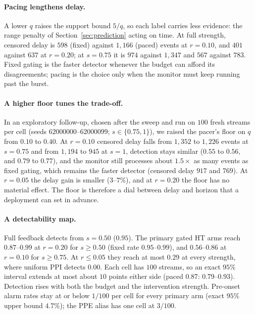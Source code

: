 \paragraph{Pacing lengthens delay.}
A lower $q$ raises the support bound $5/q$, so each label carries less evidence: the range penalty of Section~\ref{sec:prediction} acting on time.
At full strength, censored delay is $598$ (fixed) against $1{,}166$ (paced) events at $r=0.10$, and $401$ against $637$ at $r=0.20$; at $s=0.75$ it is $974$ against $1{,}347$ and $567$ against $783$.
Fixed gating is the faster detector whenever the budget can afford its disagreements; pacing is the choice only when the monitor must keep running past the burst.

\paragraph{A higher floor tunes the trade-off.}
In an exploratory follow-up, chosen after the sweep and run on $100$ fresh streams per cell (seeds $62000000$--$62000099$; $s\in\{0.75,1\}$), we raised the
pacer's floor on $q$ from $0.10$ to $0.40$. At $r=0.10$ censored delay falls from $1{,}352$ to $1{,}226$ events at $s=0.75$ and from $1{,}194$ to $945$ at $s=1$,
detection stays similar ($0.55$ to $0.56$, and $0.79$ to $0.77$), and the monitor still processes about $1.5\times$ as many events as fixed gating, which remains the faster detector (censored delay $917$ and $769$).
At $r=0.05$ the delay gain is smaller ($3$--$7\%$), and at $r=0.20$ the floor has no material effect. The floor is therefore a dial between delay and horizon
that a deployment can set in advance.

\paragraph{A detectability map.}
Full feedback detects from $s=0.50$ ($0.95$). The primary gated HT arms reach $0.87$--$0.99$ at $r=0.20$ for $s\ge0.50$ (fixed rate $0.95$--$0.99$), and $0.56$--$0.86$ at $r=0.10$ for $s\ge0.75$.
At $r\le0.05$ they reach at most $0.29$ at every strength, where uniform PPI detects $0.00$.
Each cell has $100$ streams, so an exact $95\%$ interval extends at most about $10$ points either side (paced $0.87$: $0.79$--$0.93$).
Detection rises with both the budget and the intervention strength.
Pre-onset alarm rates stay at or below $1/100$ per cell for every primary arm (exact $95\%$ upper bound $4.7\%$); the PPE alias has one cell at $3/100$.
